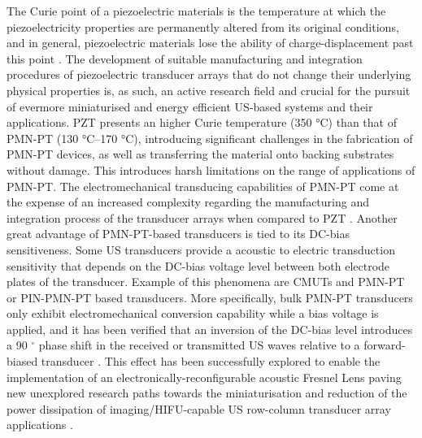 The Curie point of a piezoelectric materials is the temperature at which the 
piezoelectricity properties are permanently altered from its original 
conditions, and in general, piezoelectric materials lose the ability of 
charge-displacement past this point \cite{https://iopscience.iop.org/article/10.1088/1361-6463/ac8687}.
The development of suitable manufacturing and integration procedures of piezoelectric 
transducer arrays that do not change their underlying physical properties is, as such, 
an active research field and crucial for the pursuit of evermore miniaturised and 
energy efficient US-based systems and their applications. PZT presents an higher 
Curie temperature (350 °C) than that of PMN-PT (130 °C–170 °C), introducing significant 
challenges in the fabrication of PMN-PT devices, as well as transferring the material onto 
backing substrates without damage. This introduces harsh limitations on the range of 
applications of PMN-PT. The electromechanical transducing capabilities of PMN-PT 
come at the expense of an increased complexity regarding the manufacturing and 
integration process of the transducer arrays when compared to PZT 
\cite{https://doi.org/10.1533/9781845699758.1.318, https://iopscience.iop.org/article/10.1088/1361-6463/ac8687}. 
Another great advantage of PMN-PT-based transducers is tied to its DC-bias sensitiveness. Some US transducers provide a acoustic to electric transduction sensitivity that depends on the DC-bias voltage level between both electrode plates of the transducer. Example of this phenomena are CMUTs and PMN-PT or PIN-PMN-PT based transducers. More specifically, bulk PMN-PT transducers only exhibit electromechanical conversion capability while a bias voltage is applied, and it has been verified that an inversion of the DC-bias level introduces a 90 $\mathrm{^\circ}$ phase shift in the received or transmitted US waves relative to a forward-biased transducer \cite{10.1109/ULTSYM.2016.7728854, 10.1109/ULTSYM.2018.8579821}. This effect has been successfully explored to enable the implementation of an electronically-reconfigurable acoustic Fresnel Lens paving new unexplored research paths towards the miniaturisation and reduction of the power dissipation of imaging/HIFU-capable US row-column transducer array applications \cite{10.1109/ULTSYM.2018.8579821, 10.1109/ULTSYM.2018.8579821, 10.1109/ULTSYM.2019.8926257}.

